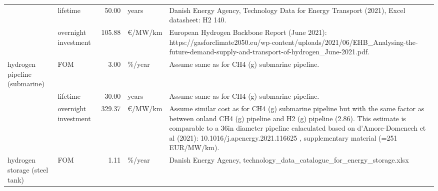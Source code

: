 \begin{longtable}{p{4cm}p{4cm}rp{3cm}p{10cm}}
                      & lifetime &        50.00 &                         years &                                                                                                                                                                                                                                          Danish Energy Agency, Technology Data for Energy Transport (2021), Excel datasheet: H2 140. \\
                      & overnight investment &       105.88 &                   \euro/MW/km &                                                                                                                                             European Hydrogen Backbone Report (June 2021): https://gasforclimate2050.eu/wp-content/uploads/2021/06/EHB\_Analysing-the-future-demand-supply-and-transport-of-hydrogen\_June-2021.pdf. \\
hydrogen pipeline (submarine) & FOM &         3.00 &                       \%/year &                                                                                                                                                                                                                                                                                       Assume same as for CH4 (g) submarine pipeline. \\
                      & lifetime &        30.00 &                         years &                                                                                                                                                                                                                                                                                       Assume same as for CH4 (g) submarine pipeline. \\
                      & overnight investment &       329.37 &                   \euro/MW/km &  Assume similar cost as for CH4 (g) submarine pipeline but with the same factor as between onland CH4 (g) pipeline and H2 (g) pipeline (2.86). This estimate is comparable to a 36in diameter pipeline calaculated based on d’Amore-Domenech et al (2021): 10.1016/j.apenergy.2021.116625 , supplementary material (=251 EUR/MW/km). \\
hydrogen storage (steel tank) & FOM &         1.11 &                       \%/year &                                                                                                                                                                                                                                                         Danish Energy Agency, technology\_data\_catalogue\_for\_energy\_storage.xlsx \\

\end{longtable}
